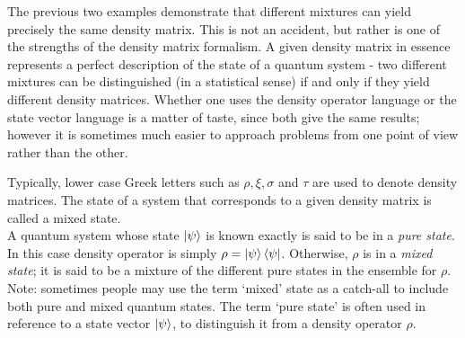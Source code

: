\documentclass[12pt, oneside]{book}
\theoremstyle{definition}
\theoremstyle{definition}
\theoremstyle{remark}
\begin{document}
The previous two examples demonstrate that different mixtures can yield precisely the same density matrix. This is not an accident, but rather is one of the strengths of the density matrix formalism. A given density matrix in essence represents a perfect description of the state of a quantum system - two different mixtures can be distinguished (in a statistical sense) if and only if they yield different density matrices. Whether one uses the density operator language or the state vector language is a matter of taste, since both give the same results; however it is sometimes much easier to approach problems from one point of view rather than the other.

Typically, lower case Greek letters such as $\rho,\xi, \sigma$ and $\tau$ are used to denote density matrices. The state of a system that corresponds to a given density matrix is called a mixed state.\\
A quantum system whose state $\ket{\psi}$ is known exactly is said to be in a \textit{pure state}. In this case density operator is simply $\rho=\ket{\psi}\bra{\psi}$. Otherwise, $\rho$ is in a \textit{mixed state}; it is said to be a mixture of the different pure states in the ensemble for $\rho$. Note: sometimes people may use the term `mixed' state as a catch-all to include both pure and mixed quantum states. The term `pure state' is often used in reference to a state vector $\ket{\psi}$, to distinguish it from a density operator $\rho$.
\end{document}
